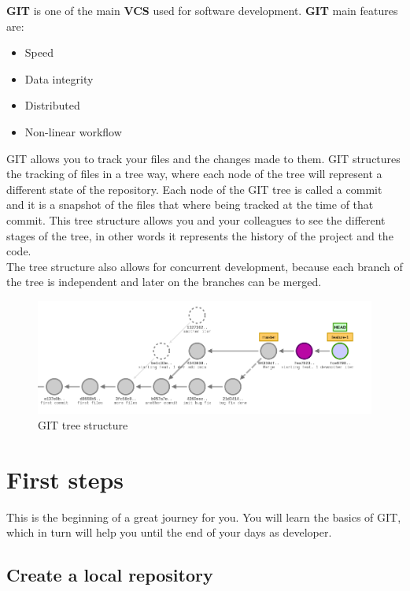 \documentclass{article}
\begin{document}
\textbf{GIT} is one of the main \textbf{VCS} used for software development. \textbf{GIT} main features are:

\begin{itemize}
\item{Speed}
\item{Data integrity}
\item{Distributed}
\item{Non-linear workflow}
\end{itemize}

GIT allows you to track your files and the changes made to them. GIT structures the tracking of files in a tree way, where each node of the tree will represent a different state of the repository. Each node of the GIT tree is called a commit and it is a snapshot of the files that where being tracked at the time of that commit. This tree structure allows you and your colleagues to see the different stages of the tree, in other words it represents the history of the project and the code.\\
The tree structure also allows for concurrent development, because each branch of the tree is independent and later on the branches can be merged.

\begin{figure}[H]
\centerline{\includegraphics[scale=0.5]{repository_after_rebase.png}}
\caption{GIT tree structure}
\label{fig1}
\end{figure}

\section{First steps}

This is the beginning of a great journey for you. You will learn the basics of GIT, which in turn will help you until the end of your days as developer.

\subsection{Create a local repository}
\end{document}
